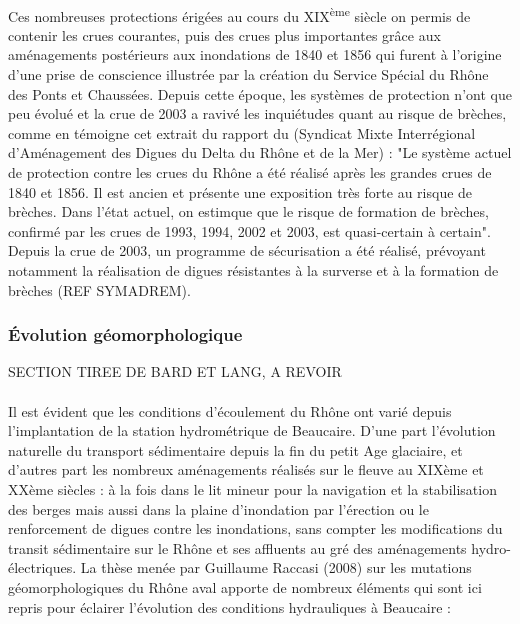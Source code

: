 \documentclass[11pt]{article}
\begin{document}
		\paragraph{} Ces nombreuses protections érigées au cours du XIX\textsuperscript{ème} siècle on permis de contenir les crues courantes, puis des crues plus importantes grâce aux aménagements postérieurs aux inondations de 1840 et 1856 qui furent à l'origine d'une prise de conscience illustrée par la création du Service Spécial du Rhône des Ponts et Chaussées. Depuis cette époque, les systèmes de protection n'ont que peu évolué et la crue de 2003 a ravivé les inquiétudes quant au risque de brèches, comme en témoigne cet extrait du rapport du \citet{symadrem_programme_2012} (Syndicat Mixte Interrégional d'Aménagement des Digues du Delta du Rhône et de la Mer) : "Le système actuel de protection contre les crues du Rhône a été réalisé après les grandes crues de 1840 et 1856. Il est ancien et présente une exposition très forte au risque de brèches. Dans l'état actuel, on estimque que le risque de formation de brèches, confirmé par les crues de 1993, 1994, 2002 et 2003, est quasi-certain à certain". Depuis la crue de 2003, un programme de sécurisation a été réalisé, prévoyant notamment la réalisation de digues résistantes à la surverse et à la formation de brèches (REF SYMADREM).    
		
		\subsubsection{Évolution géomorphologique}
		
		SECTION TIREE DE BARD ET LANG, A REVOIR
		
		\paragraph{} Il est évident que les conditions d’écoulement du Rhône ont varié depuis l’implantation de la station hydrométrique de Beaucaire. D’une part l’évolution naturelle du transport sédimentaire depuis la fin du petit Age glaciaire, et d’autres part les nombreux aménagements réalisés sur le fleuve au XIXème et XXème siècles : à la fois dans le lit mineur pour la navigation et la stabilisation des berges mais aussi dans la plaine d’inondation par l’érection ou le renforcement de digues contre les inondations, sans compter les modifications du transit sédimentaire sur le Rhône et ses affluents au gré des aménagements hydro-électriques.
La thèse menée par Guillaume Raccasi (2008) sur les mutations géomorphologiques du Rhône aval apporte de nombreux éléments qui sont ici repris pour éclairer l’évolution des conditions hydrauliques à Beaucaire :
\end{document}
